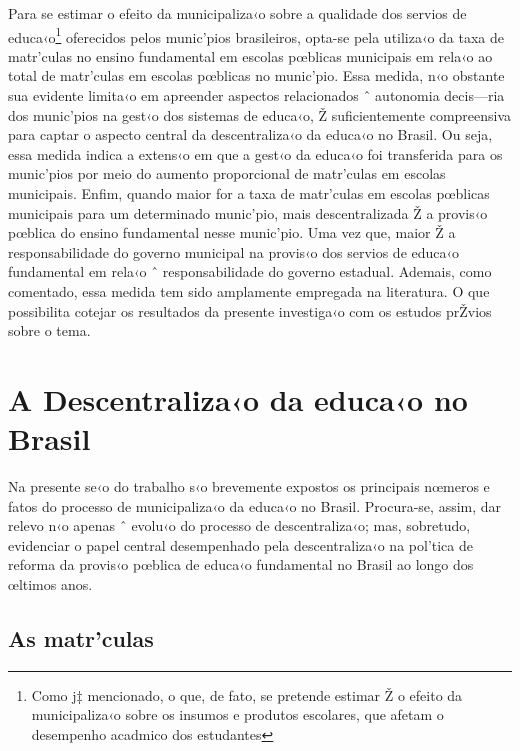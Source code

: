 \documentclass[a4paper, 12pt]{article}
\begin{document}
Para se estimar o efeito da municipaliza‹o sobre a qualidade dos servios de educa‹o\footnote{Como j‡ mencionado, o que, de fato, se pretende estimar Ž o efeito da municipaliza‹o sobre os insumos e produtos escolares, que afetam o desempenho acadmico dos estudantes} oferecidos pelos munic’pios brasileiros, opta-se pela utiliza‹o da taxa de matr’culas no ensino fundamental em escolas pœblicas municipais em rela‹o ao total de matr’culas em escolas pœblicas no munic’pio. Essa medida, n‹o obstante sua evidente limita‹o em apreender aspectos relacionados ˆ autonomia decis—ria dos munic’pios na gest‹o dos sistemas de educa‹o, Ž suficientemente compreensiva para captar o aspecto central da descentraliza‹o da educa‹o no Brasil. Ou seja, essa medida indica a extens‹o em que a gest‹o da educa‹o foi transferida para os munic’pios por meio do aumento proporcional de matr’culas em escolas municipais. Enfim, quando maior for a taxa de matr’culas em escolas pœblicas municipais para um determinado munic’pio, mais descentralizada Ž a provis‹o pœblica do ensino fundamental nesse munic’pio. Uma vez que, maior Ž a responsabilidade do governo municipal na provis‹o dos servios de educa‹o fundamental em rela‹o ˆ responsabilidade do governo estadual. Ademais, como comentado, essa medida tem sido amplamente empregada na literatura. O que possibilita cotejar os resultados da presente investiga‹o com os estudos prŽvios sobre o tema.


\pagebreak
\section{A Descentraliza‹o da educa‹o no Brasil}

Na presente se‹o do trabalho s‹o brevemente expostos os principais nœmeros e fatos do processo de municipaliza‹o da educa‹o no Brasil. Procura-se, assim, dar relevo n‹o apenas ˆ evolu‹o do processo de descentraliza‹o; mas, sobretudo, evidenciar o papel central desempenhado pela descentraliza‹o na pol’tica de reforma da provis‹o pœblica de educa‹o fundamental no Brasil ao longo dos œltimos anos. 

\subsection{As matr’culas}
\end{document}

